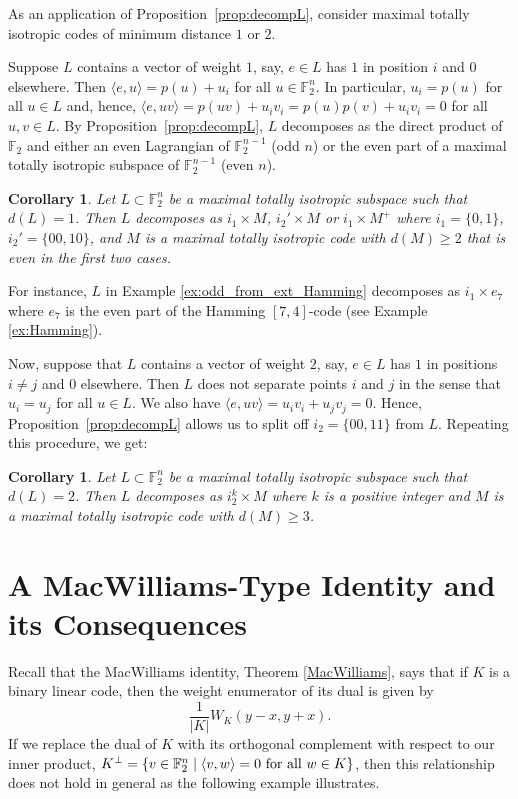 \documentclass[a4paper,reqno]{amsart}
\newcommand{\FF}{\mathbb{F}}
\newtheorem{corollary}[theorem]{Corollary}
\theoremstyle{definition}
\theoremstyle{remark} \newtheorem{remark}[theorem]{Remark}
\numberwithin{equation}{section}
\begin{document}
As an application of Proposition~\ref{prop:decompL}, consider maximal totally isotropic codes of minimum distance $1$ or $2$.

Suppose $L$ contains a vector of weight $1$, say, $e\in L$ has $1$ in position $i$ and $0$ elsewhere. Then $\langle e,u\rangle=p(u)+u_i$ for all $u\in\FF_2^n$. In particular, $u_i=p(u)$ for all $u\in L$ and, hence, $\langle e,uv\rangle=p(uv)+u_i v_i=p(u)p(v)+u_i v_i=0$ for all $u,v\in L$. By Proposition~\ref{prop:decompL}, $L$ decomposes as the direct product of $\FF_2$ and either an even Lagrangian of $\FF_2^{n-1}$ (odd $n$) or the even part of a maximal totally isotropic subspace of $\FF_2^{n-1}$ (even $n$).

\begin{corollary}\label{cor:split_off_singleton}
Let $L\subset\FF_2^n$ be a maximal totally isotropic subspace such that $d(L)=1$. 
Then $L$ decomposes as $i_1\times M$, $i_2'\times M$ or $i_1\times M^+$
where $i_1=\{0,1\}$, $i_2'=\{00,10\}$, and $M$ is a maximal totally isotropic code with $d(M)\ge 2$ that is even in the first two cases.
\end{corollary}

For instance, $L$ in Example \ref{ex:odd_from_ext_Hamming} decomposes as $i_1\times e_7$ where $e_7$ is the even part of the Hamming $[7,4]$-code (see Example \ref{ex:Hamming}).

Now, suppose that $L$ contains a vector of weight $2$, say, $e\in L$ has $1$ in positions $i\ne j$ and $0$ elsewhere. Then $L$ does not separate points $i$ and $j$ in the sense that $u_i=u_j$ for all $u\in L$. We also have $\langle e,uv\rangle=u_i v_i+u_j v_j=0$. Hence, Proposition~\ref{prop:decompL} allows us to split off $i_2=\{00,11\}$ from $L$. Repeating this procedure, we get:

\begin{corollary}\label{cor:split_off_Boolean}
Let $L\subset\FF_2^n$ be a maximal totally isotropic subspace such that $d(L)=2$. 
Then $L$ decomposes as $i_2^k \times M$ where $k$ is a positive integer and $M$ is a maximal totally isotropic code with $d(M)\ge 3$.
\end{corollary}

\section{A MacWilliams-Type Identity and its Consequences}\label{sec:MW-Type} 

Recall that the MacWilliams identity, Theorem \ref{MacWilliams}, says that if \(K\) is a binary linear code, then the weight enumerator of its dual is given by
\begin{equation*}
    \frac{1}{\lvert K \rvert} W_K(y-x, y+x).
\end{equation*}
If we replace the dual of \(K\) with its orthogonal complement with respect to our inner product, \(K^\perp = \{v \in \mathbb{F}_2^n \mid \langle v, w \rangle = 0 \textnormal{ for all } w \in K\}\), then this relationship does not hold in general as the following example illustrates.
\end{document}
